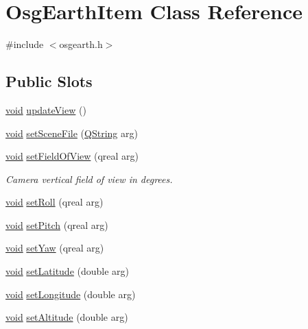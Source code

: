 \hypertarget{class_osg_earth_item}{\section{\-Osg\-Earth\-Item \-Class \-Reference}
\label{class_osg_earth_item}
}


{\ttfamily \#include $<$osgearth.\-h$>$}

\subsection*{\-Public \-Slots}
\begin{DoxyCompactItemize}
\item 
\hyperlink{group___u_a_v_objects_plugin_ga444cf2ff3f0ecbe028adce838d373f5c}{void} \hyperlink{class_osg_earth_item_ab0b89a4742045ef4077552faca93a1b8}{update\-View} ()
\item 
\hyperlink{group___u_a_v_objects_plugin_ga444cf2ff3f0ecbe028adce838d373f5c}{void} \hyperlink{class_osg_earth_item_a61dbbb4f7e1c1f56c3b35384a5aabdae}{set\-Scene\-File} (\hyperlink{group___u_a_v_objects_plugin_gab9d252f49c333c94a72f97ce3105a32d}{\-Q\-String} arg)
\item 
\hyperlink{group___u_a_v_objects_plugin_ga444cf2ff3f0ecbe028adce838d373f5c}{void} \hyperlink{class_osg_earth_item_a9d88192c0afb26a8369b125df9e2cef3}{set\-Field\-Of\-View} (qreal arg)
\begin{DoxyCompactList}\small\item\em \-Camera vertical field of view in degrees. \end{DoxyCompactList}\item 
\hyperlink{group___u_a_v_objects_plugin_ga444cf2ff3f0ecbe028adce838d373f5c}{void} \hyperlink{class_osg_earth_item_a012ebc5b61d80de96bc7d190b110a08a}{set\-Roll} (qreal arg)
\item 
\hyperlink{group___u_a_v_objects_plugin_ga444cf2ff3f0ecbe028adce838d373f5c}{void} \hyperlink{class_osg_earth_item_a0f37b61ad5dd1503bb6906c386da76dc}{set\-Pitch} (qreal arg)
\item 
\hyperlink{group___u_a_v_objects_plugin_ga444cf2ff3f0ecbe028adce838d373f5c}{void} \hyperlink{class_osg_earth_item_afa0b38fe16b06abcb9558368c8f0b01a}{set\-Yaw} (qreal arg)
\item 
\hyperlink{group___u_a_v_objects_plugin_ga444cf2ff3f0ecbe028adce838d373f5c}{void} \hyperlink{class_osg_earth_item_aea91a57a7d2ab92aa5ad4fafcd837090}{set\-Latitude} (double arg)
\item 
\hyperlink{group___u_a_v_objects_plugin_ga444cf2ff3f0ecbe028adce838d373f5c}{void} \hyperlink{class_osg_earth_item_aacb05726af49d4fc885fb1484ab37da8}{set\-Longitude} (double arg)
\item 
\hyperlink{group___u_a_v_objects_plugin_ga444cf2ff3f0ecbe028adce838d373f5c}{void} \hyperlink{class_osg_earth_item_abe3b28574187106bd8f6413e5beea982}{set\-Altitude} (double arg)
\end{DoxyCompactItemize}
